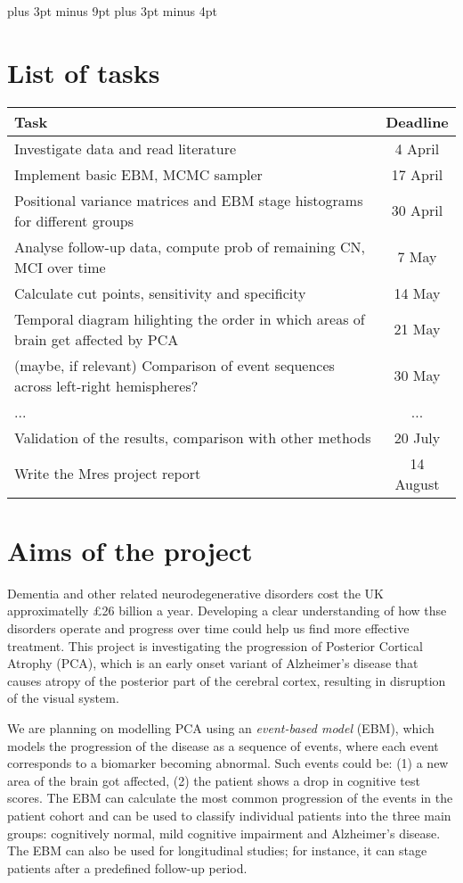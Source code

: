 \documentclass[11pt,a4paper,oneside]{report}
\begin{document}
\belowdisplayskip=12pt plus 3pt minus 9pt
\belowdisplayshortskip=7pt plus 3pt minus 4pt

\section*{List of tasks}

\renewcommand\arraystretch{4.4} %

\begin{tabular}{ l | c }
 Task & Deadline\\
 \hline
 Investigate data and read literature & 4 April\\
 Implement basic EBM, MCMC sampler & 17 April\\
 Positional variance matrices and EBM stage histograms for different groups & 30 April\\
 Analyse follow-up data, compute prob of remaining CN, MCI over time & 7 May\\
 Calculate cut points, sensitivity and specificity & 14 May\\
 Temporal diagram hilighting the order in which areas of brain get affected by PCA & 21 May\\
 (maybe, if relevant) Comparison of event sequences across left-right hemispheres? & 30 May\\
 ... & ...\\
 Validation of the results, comparison with other methods & 20 July\\
 Write the Mres project report & 14 August
 
 
\end{tabular}


\section*{Aims of the project}

Dementia and other related neurodegenerative disorders cost the UK approximatelly \pounds 26 billion a year. Developing a clear understanding of how thse disorders operate and progress over time could help us find more effective treatment. This project is investigating the progression of Posterior Cortical Atrophy (PCA), which is an early onset variant of Alzheimer's disease that  causes atropy of the posterior part of the cerebral cortex, resulting in disruption of the visual system. 

We are planning on modelling PCA using an \textit{event-based model} (EBM), which models the progression of the disease as a sequence of events, where each event corresponds to a biomarker becoming abnormal. Such events could be: (1) a new area of the brain got affected, (2) the patient shows a drop in cognitive test scores. The EBM can calculate the most common progression of the events in the patient cohort and can be used to classify individual patients into the three main groups: cognitively normal, mild cognitive impairment and Alzheimer's disease. The EBM can also be used for longitudinal studies; for instance, it can stage patients after a predefined follow-up period.
\end{document}
